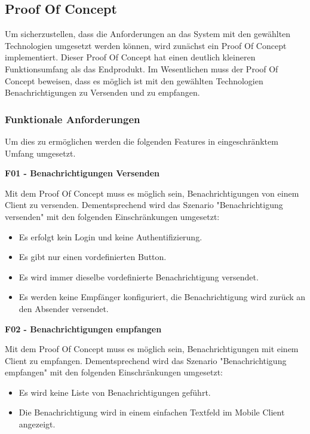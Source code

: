 \subsection{Proof Of Concept}\label{subsec:poc}

Um sicherzustellen, dass die Anforderungen an das System mit den gewählten Technologien umgesetzt werden können, wird zunächst ein Proof Of Concept implementiert.
Dieser Proof Of Concept hat einen deutlich kleineren Funktionsumfang als das Endprodukt.
Im Wesentlichen muss der Proof Of Concept beweisen, dass es möglich ist mit den gewählten Technologien Benachrichtigungen zu Versenden und zu empfangen.

\subsubsection{Funktionale Anforderungen}

Um dies zu ermöglichen werden die folgenden Features in eingeschränktem Umfang umgesetzt.

\textbf{F01 - Benachrichtigungen Versenden}

Mit dem Proof Of Concept muss es möglich sein, Benachrichtigungen von einem Client zu versenden.
Dementsprechend wird das Szenario "Benachrichtigung versenden" mit den folgenden Einschränkungen umgesetzt:

\begin{itemize}
    \item Es erfolgt kein Login und keine Authentifizierung.
    \item Es gibt nur einen vordefinierten Button.
    \item Es wird immer dieselbe vordefinierte Benachrichtigung versendet.
    \item Es werden keine Empfänger konfiguriert, die Benachrichtigung wird zurück an den Absender versendet.
\end{itemize}


\textbf{F02 - Benachrichtigungen empfangen}

Mit dem Proof Of Concept muss es möglich sein, Benachrichtigungen mit einem Client zu empfangen.
Dementsprechend wird das Szenario "Benachrichtigung empfangen" mit den folgenden Einschränkungen umgesetzt:

\begin{itemize}
    \item Es wird keine Liste von Benachrichtigungen geführt.
    \item Die Benachrichtigung wird in einem einfachen Textfeld im Mobile Client angezeigt.
\end{itemize}


